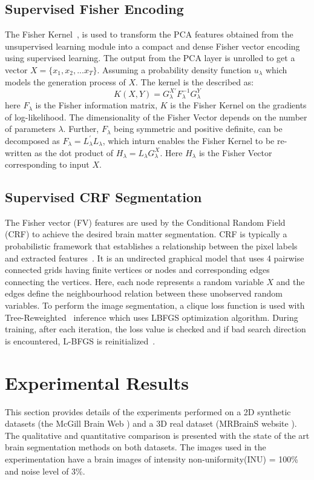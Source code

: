 \documentclass[10pt,twocolumn,letterpaper]{article}
\begin{document}
\subsection{Supervised Fisher Encoding}
The Fisher Kernel~\cite{FV},  is used to transform the PCA features obtained from the unsupervised learning module into a compact and dense Fisher vector encoding using supervised learning. The output from the PCA layer is unrolled to get a vector $X = \{x_1, x_2, ...x_T\}$. Assuming a probability density function $u_{\lambda}$ which models the generation process of $X$. The kernel is the described as:
\begin{equation}\label{eq:FisherKernel}
K(X,Y) = G_{\lambda}^{X'}F_{\lambda}^{-1}G_{\lambda}^{Y}
\end{equation}
here $F_{\lambda}$ is the Fisher information matrix, $K$ is the Fisher Kernel on the gradients of log-likelihood. The dimensionality of the Fisher Vector depends on the number of parameters $\lambda$. Further, $F_{\lambda}$ being symmetric and positive definite, can be decomposed as $F_{\lambda} = L_{\lambda}^{'}L_{\lambda}$, which inturn enables the Fisher Kernel to be re-written as the dot product of $H_{\lambda} = L_{\lambda}G_{\lambda}^{X}$. Here  $H_{\lambda}$ is the Fisher Vector corresponding to input $X$.



\subsection{Supervised CRF Segmentation}
\par
The Fisher vector (FV) features are used by the Conditional Random Field (CRF) to achieve the desired brain matter segmentation. CRF is typically a probabilistic framework that establishes a relationship between the pixel labels and extracted features~\cite{domke2013learning}. It is an undirected graphical model that uses 4 pairwise connected grids having finite vertices or nodes and corresponding edges connecting the vertices. Here, each node represents a random variable $X$ and the edges define the neighbourhood relation between these unobserved random variables. To perform the image segmentation, a clique loss function is used with Tree-Reweighted~\cite{domke2013learning} inference which uses LBFGS optimization algorithm. During training, after each iteration, the loss value is checked and if bad search direction is encountered, L-BFGS is reinitialized~\cite{domke2013learning}.

\section{Experimental Results}
This section provides details of the experiments performed on a 2D synthetic datasets (the McGill Brain Web \cite{kwan1999mri}) and a 3D real dataset (MRBrainS website \cite{mendrik2015mrbrains}). The qualitative and quantitative comparison is presented with the state of the art brain segmentation methods on both datasets. The images used in the experimentation have a brain images of intensity
non-uniformity(INU) = 100\% and noise level of 3\%.
\end{document}
